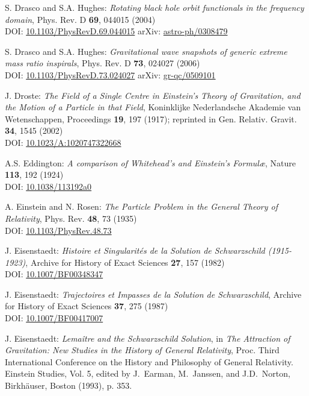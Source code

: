 \begin{thebibliography}{123}
S. Drasco and S.A. Hughes:
{\em Rotating black hole orbit functionals in the frequency domain},
Phys. Rev. D {\bf 69}, 044015 (2004)\\
DOI: \href{https://doi.org/10.1103/PhysRevD.69.044015}{10.1103/PhysRevD.69.044015}\hfill
arXiv: \href{https://arxiv.org/abs/astro-ph/0308479}{astro-ph/0308479}

S. Drasco and S.A. Hughes:
{\em Gravitational wave snapshots of generic extreme mass ratio inspirals},
Phys. Rev. D {\bf 73}, 024027 (2006)\\
DOI: \href{https://doi.org/10.1103/PhysRevD.73.024027}{10.1103/PhysRevD.73.024027}\hfill
arXiv: \href{https://arxiv.org/abs/gr-qc/0509101}{gr-qc/0509101}

J. Droste:
{\em The Field of a Single Centre in Einstein's Theory of Gravitation, and the Motion of a Particle in that Field},
Koninklijke Nederlandsche Akademie van Wetenschappen, Proceedings {\bf 19}, 197 (1917);
reprinted in Gen. Relativ. Gravit. {\bf 34}, 1545 (2002)\\
DOI: \href{https://doi.org/10.1023/A:1020747322668}{10.1023/A:1020747322668}

A.S. Eddington: {\em A comparison of Whitehead's and Einstein's Formul\ae},
Nature {\bf 113}, 192 (1924) \\
DOI: \href{https://doi.org/10.1038/113192a0}{10.1038/113192a0}

A. Einstein and N. Rosen:
{\em The Particle Problem in the General Theory of Relativity},
Phys. Rev. {\bf 48}, 73 (1935) \\
DOI: \href{https://doi.org/10.1103/PhysRev.48.73}{10.1103/PhysRev.48.73}

J. Eisenstaedt:
{\em Histoire et Singularit\'es de la Solution de Schwarzschild (1915-1923)},
Archive for History of Exact Sciences {\bf 27}, 157 (1982) \\
DOI: \href{https://doi.org/10.1007/BF00348347}{10.1007/BF00348347}

J. Eisenstaedt:
{\em Trajectoires et Impasses de la Solution de Schwarzschild},
Archive for History of Exact Sciences {\bf 37}, 275 (1987) \\
DOI: \href{https://doi.org/10.1007/BF00417007}{10.1007/BF00417007}

J. Eisenstaedt: {\em Lemaître and the Schwarzschild Solution}, in
{\em The Attraction of Gravitation: New Studies in the History of
General Relativity}, Proc. Third International Conference on the History and Philosophy of General Relativity. Einstein
Studies, Vol. 5, edited by J.~Earman, M.~Janssen, and J.D.~Norton,
Birkhäuser, Boston (1993), p. 353.


\end{thebibliography}
